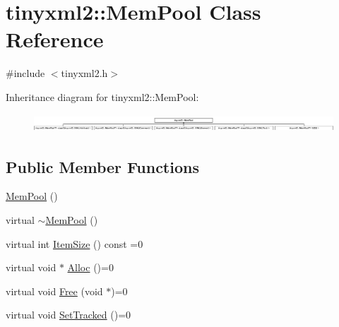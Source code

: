\hypertarget{classtinyxml2_1_1_mem_pool}{\section{tinyxml2\-:\-:Mem\-Pool Class Reference}
\label{classtinyxml2_1_1_mem_pool}
}


{\ttfamily \#include $<$tinyxml2.\-h$>$}

Inheritance diagram for tinyxml2\-:\-:Mem\-Pool\-:\begin{figure}[H]
\begin{center}
\leavevmode
\includegraphics[height=0.691358cm]{classtinyxml2_1_1_mem_pool}
\end{center}
\end{figure}
\subsection*{Public Member Functions}
\begin{DoxyCompactItemize}
\item 
\hyperlink{classtinyxml2_1_1_mem_pool_a9101a0083d7370c85bd5aaaba7157f84}{Mem\-Pool} ()
\item 
virtual \hyperlink{classtinyxml2_1_1_mem_pool_ae55ad9e3faeca702e6ccbb38fdbcad72}{$\sim$\-Mem\-Pool} ()
\item 
virtual int \hyperlink{classtinyxml2_1_1_mem_pool_a0c518d49e3a94bde566f61e13b7240bb}{Item\-Size} () const =0
\item 
virtual void $\ast$ \hyperlink{classtinyxml2_1_1_mem_pool_a4f977b5fed752c0bbfe5295f469d6449}{Alloc} ()=0
\item 
virtual void \hyperlink{classtinyxml2_1_1_mem_pool_a49e3bfac2cba2ebd6776b31e571f64f7}{Free} (void $\ast$)=0
\item 
virtual void \hyperlink{classtinyxml2_1_1_mem_pool_ac5804dd1387b2e4de5eef710076a0db1}{Set\-Tracked} ()=0
\end{DoxyCompactItemize}


